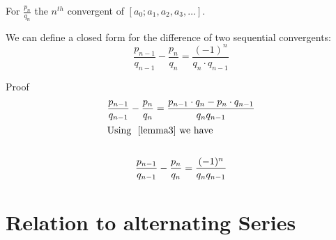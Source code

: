 \documentclass[a4paper]{article}
\begin{document}
    \begin{lemma}
        \label{lemma2}
        For $\frac{p_{n}}{q_n}$ the $n^{th}$ convergent of $[a_0; a_1, a_2, a_3, \dots]$.

        We can define a closed form for the difference of two sequential convergents:
        \[
        \frac{p_{n-1}}{q_{n-1}} - \frac{p_{n}}{q_n} = \frac{(-1)^n}{q_n \cdot q_{n-1}}
        \]

        Proof
        \begin{gather*}
            \frac{p_{n-1}}{q_{n-1}} - \frac{p_{n}}{q_n}
            = \frac{p_{n-1} \cdot q_n - p_{n} \cdot q_{n-1}}{q_{n} q_{n-1}}  \\
            \shortintertext{Using ~\ref{lemma3} we have} \\
            \frac{p_{n-1}}{q_{n-1}} - \frac{p_{n}}{q_n} = \frac{(-1)^n}{q_{n} q_{n-1}}
        \end{gather*}
    \end{lemma}


    \section{Relation to alternating Series}\label{sec:relation-to-alternating-series}
\end{document}
